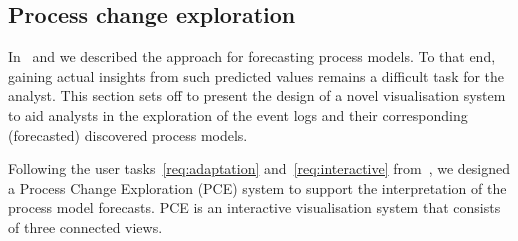 \subsection{Process change exploration}\label{sec:3c:pce}




In~ and  we described the approach for forecasting process models. To that end, gaining actual insights from such predicted values remains a difficult task for the analyst. This section sets off to present the design of a novel visualisation system to aid analysts in the exploration of the event logs and their corresponding (forecasted) discovered process models.

Following the user tasks~\ref{req:adaptation} and~\ref{req:interactive} from~, we designed a Process Change Exploration (PCE) system to support the interpretation of the process model forecasts. PCE is an interactive visualisation system that consists of three connected views.




%
%




